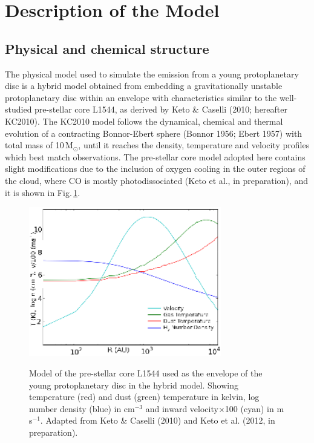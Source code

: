 \documentclass[useAMS,usenatbib]{mn2e}
\begin{document}
\section{Description of the Model} \label{sec:description_model}

\subsection{Physical and chemical structure} \label{subsec:physical_structure}


The physical model used to simulate the emission from a young protoplanetary disc is a hybrid model obtained from embedding a gravitationally unstable protoplanetary disc  within an envelope with characteristics similar to the well-studied pre-stellar core L1544, as derived by Keto \& Caselli (2010; hereafter KC2010). The KC2010 model follows the dynamical, chemical and thermal evolution of a contracting Bonnor-Ebert sphere (Bonnor 1956; Ebert 1957) with total mass of 10\,M$_{\odot}$, until it reaches the density, temperature and velocity profiles which best match observations. The pre-stellar core model adopted here contains slight modifications due to the inclusion of oxygen cooling in the outer regions of the cloud, where CO is mostly photodissociated (Keto et al., in preparation), and it is shown in Fig.\,\ref{fig:l1544_model}. \newline

\begin{figure}
 \includegraphics[width=84mm]{Figures/model/L1544model_used_legend_small.eps}
 \label{fig:l1544_model}
 \caption{Model of the pre-stellar core L1544 used as the envelope of the young protoplanetary disc in the hybrid model. Showing temperature (red) and dust (green) temperature in kelvin, log number density (blue) in cm$^{-3}$ and inward velocity$\times$100 (cyan) in m$\,$s$^{-1}$. Adapted from Keto \& Caselli (2010) and Keto et al. (2012, in preparation).}
\end{figure}
\end{document}
